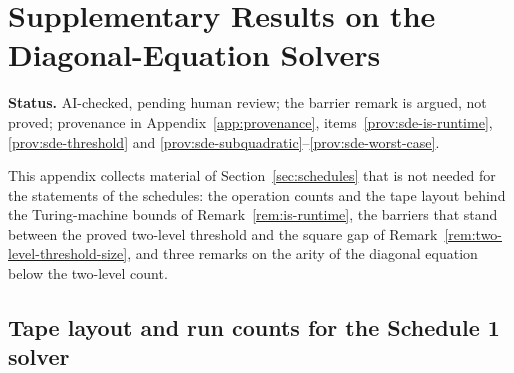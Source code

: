 \section{Supplementary Results on the Diagonal-Equation Solvers}
\label{app:sde-side}

\noindent\textbf{Status.} AI-checked, pending human review; the barrier remark is argued, not proved; provenance in Appendix~\ref{app:provenance}, items~\ref{prov:sde-is-runtime}, \ref{prov:sde-threshold} and \ref{prov:sde-subquadratic}--\ref{prov:sde-worst-case}.

This appendix collects material of Section~\ref{sec:schedules} that is not needed for the statements of the schedules: the operation counts and the tape layout behind the Turing-machine bounds of Remark~\ref{rem:is-runtime}, the barriers that stand between the proved two-level threshold and the square gap of Remark~\ref{rem:two-level-threshold-size}, and three remarks on the arity of the diagonal equation below the two-level count.

\subsection{Tape layout and run counts for the Schedule 1 solver}
\label{app:sde-side-tape}

